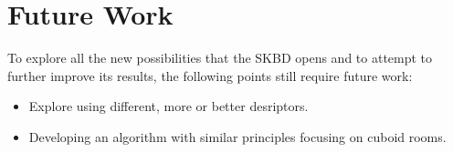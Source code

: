 \section{Future Work}

To explore all the new possibilities that the SKBD opens and to attempt to further improve its results, the following points still require future work:
\begin{itemize}
  \item Explore using different, more or better desriptors.
  \item Developing an algorithm with similar principles focusing on cuboid rooms.
\end{itemize}
